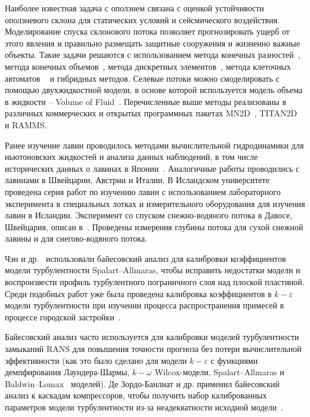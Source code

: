 \documentclass[mathematics,article,accept,pdftex,moreauthors]{Definitions/mdpi}
\begin{document}

Наиболее известная задача с оползнем связана с оценкой устойчивости оползневого склона для статических условий и сейсмического воздействия. Моделирование спуска склонового потока позволяет прогнозировать ущерб от этого явления и правильно размещать защитные сооружения и жизненно важные объекты. Такие задачи решаются с использованием метода конечных разностей~\cite{Bernander2016}, метода конечных объемов~\cite{liu2007application}, метода дискретных элементов~\cite{Liu2020}, метода клеточных автоматов ~\cite{piegari2006cellular} и гибридных методов. Селевые потоки можно смоделировать с помощью двухжидкостной модели, в основе которой используется модель объема в жидкости – Volume of Fluid~\cite{Hirt1981}. Перечисленные выше методы реализованы в различных коммерческих и открытых программных пакетах MN2D~\cite{Naaim2002}, TITAN2D~\cite{Pitman2003} и RAMMS.

Ранее изучение лавин проводилось методами вычислительной гидродинамики для ньютоновских жидкостей и анализа данных наблюдений, в том числе исторических данных о лавинах в Японии~\cite{Oda2011, Yamaguchi2017}. Аналогичные работы проводились с лавинами в Швейцарии, Австрии и Италии. В Исландском университете ~\cite{IceThesKatr, IceThesJon} проведена серия работ по изучению лавин с использованием лабораторного эксперимента в специальных лотках и измерительного оборудования для изучения лавин в Исландии. Эксперимент со спуском снежно-водяного потока в Давосе, Швейцария, описан в~\cite{Jaedicke2006}. Проведены измерения глубины потока для сухой снежной лавины и для снегово-водяного потока.

Чэн и др.~\cite{Cheung2011} использовали байесовский анализ для калибровки коэффициентов модели турбулентности Spalart--Allmaras, чтобы исправить недостатки модели и воспроизвести профиль турбулентного пограничного слоя над плоской пластиной. Среди подобных работ уже была проведена калибровка коэффициентов в $k-\varepsilon$ модели турбулентности при изучении процесса распространения примесей в процессе городской застройки~\cite{Guillas2014}.

Байесовский анализ часто используется для калибровки моделей турбулентности замыканий RANS для повышения точности прогноза без потери вычислительной эффективности (как это было сделано для модели $k{-}\varepsilon$ с функциями демпфирования Лаундера-Шармы, $k{-}\omega$ Wilcox-модели, Spalart--Allmaras и Baldwin--Lomax~\cite{Edeling2014a,Edeling2014b} моделей). Де Зордо-Банлиат и др. применил байесовский анализ к каскадам компрессоров, чтобы получить набор калиброванных параметров модели турбулентности из-за неадекватности исходной модели~\cite{deZordoBanliat2020}.
\end{document}

